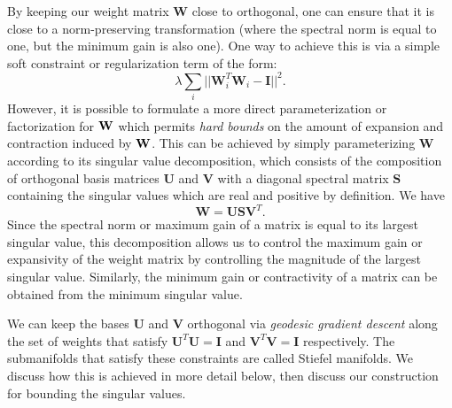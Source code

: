\documentclass{article} %
\begin{document}
By keeping our weight matrix $\mathbf{W}$ close to orthogonal, one can ensure that it is close to a norm-preserving transformation (where the spectral norm is equal to one, but the minimum gain is also one). One way to achieve this is via a simple soft constraint or regularization term of the form:
\begin{equation}\label{eq:soft_orthogonality}
\lambda \sum_i ||\mathbf{W}_i^T \mathbf{W}_i - \mathbf{I}||^2.
\end{equation}
However, it is possible to formulate a more direct parameterization or factorization for $\bf{W}$ which permits \emph{hard bounds} on the amount of expansion and contraction induced by $\bf{W}$.   %
This can be achieved by simply parameterizing ${\mathbf{W}}$ according to its singular value decomposition, which consists of the composition of orthogonal basis matrices ${\mathbf{U}}$ and ${\mathbf{V}}$ with a diagonal spectral matrix ${\mathbf{S}}$ containing the singular values which are real and positive by definition. We have
\begin{equation}
\mathbf{W}=\mathbf{U}\mathbf{S}\mathbf{V}^T.
\label{eq:factorization}
\end{equation}
Since the spectral norm or maximum gain of a matrix is equal to its largest singular value, this decomposition allows us to control the maximum gain or expansivity of the weight matrix by controlling the magnitude of the largest singular value. Similarly, the minimum gain or contractivity of a matrix can be obtained from the minimum singular value.

We can keep the bases $\mathbf{U}$ and $\mathbf{V}$ orthogonal via \emph{geodesic gradient descent} along the set of weights that satisfy $\mathbf{U}^T\mathbf{U}=\mathbf{I}$ and $\mathbf{V}^T\mathbf{V}=\mathbf{I}$ respectively.  The submanifolds that satisfy these constraints are called Stiefel manifolds. We discuss how this is achieved in more detail below, then discuss our construction for bounding the singular values.
\end{document}
